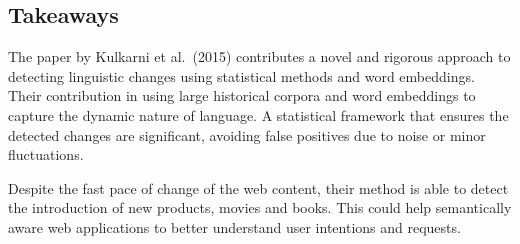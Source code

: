 \subsection{Takeaways} \label{subsec:kulkarni-takeaways}
The paper by Kulkarni et al.\ (2015) contributes a novel and rigorous approach to detecting linguistic changes using statistical methods and word embeddings.
Their contribution in using large historical corpora and word embeddings to capture the dynamic nature of language.
A statistical framework that ensures the detected changes are significant, avoiding false positives due to noise or minor fluctuations.

Despite the fast pace of change of the web content, their method is able to detect the introduction of new products, movies and books.
This could help semantically aware web applications to better understand user intentions and requests.



